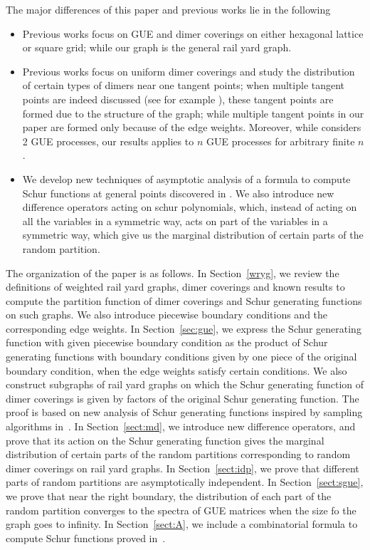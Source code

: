 \documentclass[11pt]{amsart}
\theoremstyle{plain}
\theoremstyle{definition}
\theoremstyle{remark}
\numberwithin{equation}{section}
\numberwithin{theorem}{section}
\numberwithin{figure}{section}
\begin{document}
The major differences of this paper and previous works lie in the following
\begin{itemize}
\item Previous works focus on GUE and dimer coverings on either hexagonal lattice or square grid; while our graph is the general rail yard graph.
\item Previous works focus on uniform dimer coverings and study  the distribution of certain types of dimers near one tangent points; when multiple tangent points are indeed discussed (see for example \cite{AM13}), these tangent points are formed due to the structure of the graph; while multiple tangent points in our paper are formed only because of the edge weights. Moreover, while \cite{AM13} considers 2 GUE processes, our results applies to $n$ GUE processes for arbitrary finite $n$.
\item We develop new techniques of asymptotic analysis of a formula to compute Schur functions at general points discovered in \cite{ZL18}. We also introduce new difference operators acting on schur polynomials, which, instead of acting on all the variables in a symmetric way, acts on part of the variables in a symmetric way, which give us the marginal distribution of certain parts of the random partition.
\end{itemize}


The organization of the paper is as follows. In Section~\ref{wryg}, we review the definitions of weighted rail yard graphs, dimer coverings and known results to compute the partition function of dimer coverings and Schur generating functions on such graphs.  We also introduce piecewise boundary conditions and the corresponding edge weights.
In Section~\ref{sec:gue}, we express the Schur generating function with given piecewise boundary condition as the product of Schur generating functions with boundary conditions given by one piece of the original boundary condition, when the edge weights satisfy certain conditions. We also construct subgraphs of rail yard graphs on which the Schur generating function of dimer coverings is given by factors of the original Schur generating function. The proof is based on new analysis of Schur generating functions inspired by sampling algorithms in~\cite{bbb14}. In Section~\ref{sect:md}, we introduce new difference operators, and prove that its action on the Schur generating function gives the marginal distribution of certain parts of the random partitions corresponding to random dimer coverings on rail yard graphs. In Section~\ref{sect:idp}, we prove that different parts of random partitions are asymptotically independent.
In Section~\ref{sect:sgue}, we prove that near the right boundary, the distribution of each part of the random partition converges to the spectra of GUE matrices when the size fo the graph goes to infinity.
In Section~\ref{sect:A}, we include a combinatorial formula to compute Schur functions proved in~\cite{ZL18}.
\end{document}
